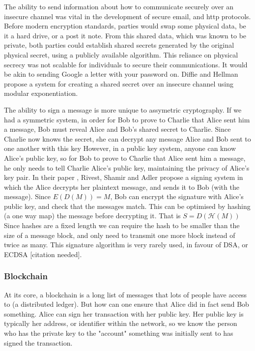 \documentclass{article}
\begin{document}
The ability to send information about how to communicate securely over an insecure channel was vital in the development of secure email, and http protocols.
Before modern encryption standards, parties would swap some physical data, be it a hard drive, or a post it note.
From this shared data, which was known to be private,
both parties could establish shared secrets generated by the original physical secret,
using a publicly available algorithm.
This reliance on physical secrecy was not scalable for individuals to secure their communications.
It would be akin to sending Google a letter with your password on.
Diffie and Hellman \cite{Directions} propose a system for creating a shared secret over an insecure channel using modular exponentiation.

The ability to sign a message is more unique to assymetric cryptography.
If we had a symmetric system, in order for Bob to prove to Charlie that Alice sent him a message,
Bob must reveal Alice and Bob's shared secret to Charlie.
Since Charlie now knows the secret, she can decrypt any message Alice and Bob sent to one another with this key
However, in a public key system, anyone can know Alice's public key, so for Bob to prove to Charlie that Alice sent him a message,
he only needs to tell Charlie Alice's public key, maintaining the privacy of Alice's key pair.
In their paper \cite{RSA}, Rivest, Shamir and Adler propose a signing system
in which the Alice decrypts her plaintext message, and sends it to Bob (with the message).
Since $E(D(M)) = M$, Bob can encrypt the signature with Alice's public key, and check that the messages match.
This can be optimised by hashing (a one way map) the message before decrypting it. That is $S = D(\mathcal{H}(M))$
Since hashes are a fixed length we can require the hash to be smaller than the size of a message block,
and only need to transmit one more block instead of twice as many.
This signature algorithm is very rarely used, in favour of DSA, or ECDSA [citation needed].

\subsubsection{Blockchain}
At its core, a blockchain is a long list of messages that lots of people have access to (a distributed ledger).
But how can one ensure that Alice did in fact send Bob something.
Alice can sign her transaction with her public key.
Her public key is typically her address, or identifier within the network,
so we know the person who has the private key to the "account"
something was initially sent to has signed the transaction.
\end{document}
